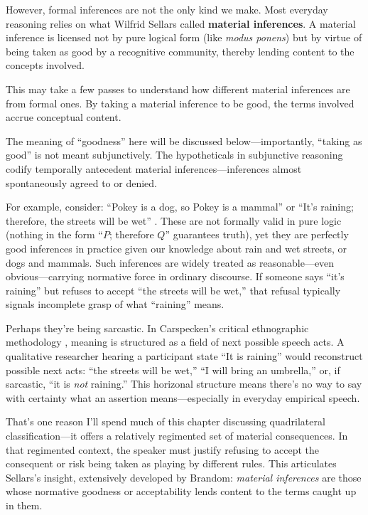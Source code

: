 \documentclass[12pt]{book}
\begin{document}
However, formal inferences are not the only kind we make. Most everyday reasoning relies on what Wilfrid Sellars \parencite*{Sellars:1953aa} called \textbf{material inferences}. A material inference is licensed not by pure logical form (like \emph{modus ponens}) but by virtue of being taken as good by a recognitive community, thereby lending content to the concepts involved.

This may take a few passes to understand how different material inferences are from formal ones. By taking a material inference to be good, the terms involved accrue conceptual content.

The meaning of ``goodness'' here will be discussed below---importantly, ``taking as good'' is not meant subjunctively. The hypotheticals in subjunctive reasoning codify temporally antecedent material inferences---inferences almost spontaneously agreed to or denied.

For example, consider: ``Pokey is a dog, so Pokey is a mammal'' or ``It's raining; therefore, the streets will be wet'' \parencite[313]{Sellars:1953aa}. These are not formally valid in pure logic (nothing in the form ``\(P\); therefore \(Q\)'' guarantees truth), yet they are perfectly good inferences in practice given our knowledge about rain and wet streets, or dogs and mammals. Such inferences are widely treated as reasonable---even obvious---carrying normative force in ordinary discourse. If someone says ``it's raining'' but refuses to accept ``the streets will be wet,'' that refusal typically signals incomplete grasp of what ``raining'' means.

Perhaps they're being sarcastic. In Carspecken's critical ethnographic methodology \parencite*{Carspecken1995aa}, meaning is structured as a field of next possible speech acts. A qualitative researcher hearing a participant state ``It is raining'' would reconstruct possible next acts: ``the streets will be wet,'' ``I will bring an umbrella,'' or, if sarcastic, ``it is \emph{not} raining.'' This horizonal structure means there's no way to say with certainty what an assertion means---especially in everyday empirical speech.

That's one reason I'll spend much of this chapter discussing quadrilateral classification---it offers a relatively regimented set of material consequences. In that regimented context, the speaker must justify refusing to accept the consequent or risk being taken as playing by different rules. This articulates Sellars's insight, extensively developed by Brandom: \emph{material inferences} are those whose normative goodness or acceptability lends content to the terms caught up in them.
\end{document}
